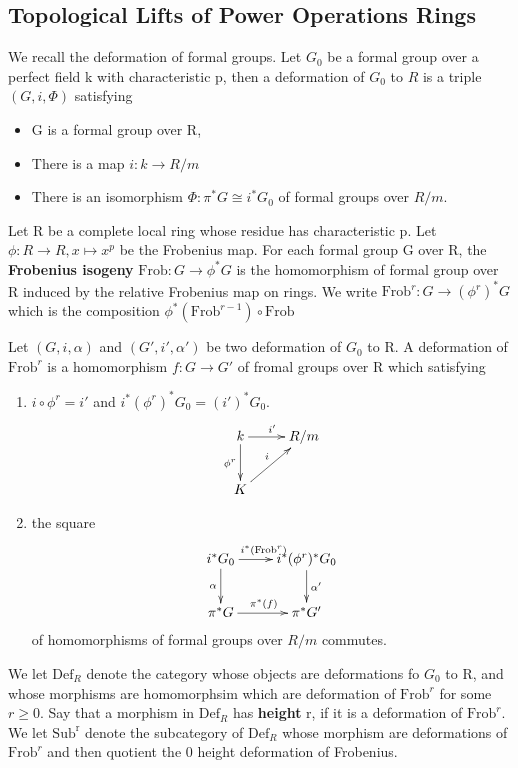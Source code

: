 \documentclass[12pt]{article}
\theoremstyle{thry}
\def  \Def      {\mathrm{Def}}
\def  \Frob     {\mathrm{Frob}}
\begin{document}
\subsection{Topological Lifts of Power Operations Rings}
We recall the deformation of formal groups. Let $G_0$ be a formal group over a perfect field k with characteristic p, then a deformation of $G_0$ to $R$ is a triple $(G,i, \Phi)$  satisfying 
\begin{itemize}
	\item G is a formal group over R,
	\item There is a map $i: k \to R/m$
	\item There is an isomorphism $\Phi : \pi^* G \cong i ^* G_0$ of formal groups over $R/m$.
	
\end{itemize}

Let R be  a complete local ring whose residue has characteristic p. Let $\phi : R \to R, x \mapsto x^p$ be the Frobenius map. For each formal group G over R, the \textbf{Frobenius isogeny} $\mathrm{Frob}: G \to \phi^* G$ is the homomorphism of formal group over R induced by the relative Frobenius map on rings. We write $\mathrm{Frob}^r: G \to (\phi^r)^* G$ which is the composition $\phi^* (\mathrm{Frob}^{r-1}) \circ \mathrm{Frob}$
	
Let $(G,i ,\alpha)$ and $(G',i', \alpha' )$ be two deformation of $G_0$ to R.  A deformation of $\mathrm{Frob}^r$ is a homomorphism $f: G \to G'$ of fromal groups over R  which satisfying
\begin{enumerate}
	\item $ i \circ \phi^r = i' $ and $i^* (\phi^r)^* G_0 = (i')^* G_0$.
	$$
	\xymatrix{
		k \ar[r]^{i'} \ar[d]_{\phi^r}  &  R/m  \\
		K  \ar[ur]^{i}	&    \\
	}
	$$
	\item the square 
	$$
	\xymatrix{
		i^* G_0   \ar[r]^{ i^* ({\Frob^r})}	\ar[d]_{\alpha}  &  i^*(\phi^r)^* G_0   \ar[d]^{\alpha'} \\
		\pi ^* G  \ar[r]^{\pi^*(f)}   &   \pi^* G'  \\
	}
	$$
	of homomorphisms of formal groups over $R/m$ commutes.
\end{enumerate}

We let $\mathrm{Def}_R$ denote the category whose objects are deformations fo $G_0$ to R, and whose morphisms are homomorphsim which are deformation of $\Frob ^r$ for some $r \geq 0$. Say that a morphism in $\mathrm{Def}_R$ has \textbf{height} r, if it is a deformation of $\Frob^r$. We let $\mathrm{Sub^r}$ denote the subcategory of  $\Def_R$ whose morphism are deformations of $\Frob^r$  and then quotient the 0 height deformation of Frobenius.
\end{document}
